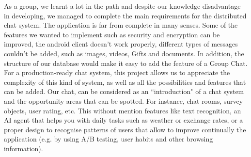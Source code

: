 As a group, we learnt a lot in the path and despite our knowledge disadvantage in developing, we managed to complete the main requirements for the distributed chat system. The application is far from complete in many senses. Some of the features we wanted to implement such as security and encryption can be improved, the android client doesn't work properly, different types of messages couldn't be added, such as images, videos, Gifts and documents. In addition, the structure of our database would make it easy to add the feature of a Group Chat. For a production-ready chat system, this project allows us to appreciate the complexity of this kind of system, as well as all the possibilities and features that can be added. Our chat, can be considered as an ``introduction" of a chat system and the opportunity areas that can be spotted. For instance, chat rooms, survey objects, user rating, etc. This without mention features like text recognition, an AI agent that helps you with daily tasks such as weather or exchange rates, or a proper design to recognise patterns of users that allow to improve continually the application (e.g. by using A/B testing, user habits and other browsing information).
